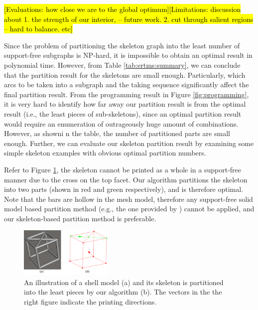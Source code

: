 \hl {[Evaluations: how close we are to the global optimum][Limitations: discussion about 1. the strength of our interior, -- future work. 2. cut through salient regions -- hard to balance. etc]} 

Since the problem of partitioning the skeleton graph into the least number of support-free subgraphs is NP-hard, it is impossible to obtain an optimal result in polynomial time. However, from Table \ref{tab:ertms:summary}, we can conclude that the partition result for the skeletons are small enough. Particularly, which arcs to be taken into a subgraph and the taking sequence significantly affect the final partition result. From the programming result in Figure \ref{fig:programming}, it is very hard to identify how far away our partition result is from the optimal result (i.e., the least pieces of sub-skeletons), since an optimal partition result would require an enumeration of outrageously huge amount of combinations. However, as showni n the table, the number of partitioned parts are small enough. Further, we can evaluate our skeleton partition result by examining some simple skeleton examples with obvious optimal partition numbers.

Refer to Figure \ref{fig:cube}, the skeleton cannot be printed as a whole in a support-free manner due to the cross on the top facet. Our algorithm partitions the skeleton into two parts (shown in red and green respectively), and is therefore optimal. Note that the bars are hollow in the mesh model, therefore any support-free solid model based partition method (e.g., the one provided by \cite{Hu_siga14}) cannot be applied, and our skeleton-based partition method is preferable.

\begin{figure}[tbp]
  \centering
  \includegraphics[width=0.4\textwidth]{figs/cube.png}
  \caption{\label{fig:cube}%
           An illustration of a shell model (a) and its skeleton is partitioned into the least pieces by our algorithm (b). The vectors in the the right figure indicate the printing directions.}
\end{figure}



